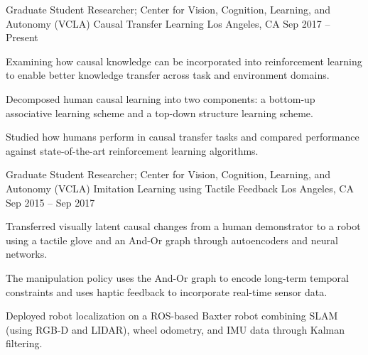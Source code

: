 


\begin{cventries}


\cventry
{Graduate Student Researcher; Center for Vision, Cognition, Learning, and Autonomy (VCLA)}
{Causal Transfer Learning}
{Los Angeles, CA}
{Sep 2017 – Present}
{
\begin{cvitems}
\item Examining how causal knowledge can be incorporated into reinforcement learning to enable better knowledge transfer across task and environment domains.
\item Decomposed human causal learning into two components: a bottom-up associative learning scheme and a top-down structure learning scheme.
\item Studied how humans perform in causal transfer tasks and compared performance against state-of-the-art reinforcement learning algorithms.
\end{cvitems}
}


\cventry
{Graduate Student Researcher; Center for Vision, Cognition, Learning, and Autonomy (VCLA)}
{Imitation Learning using Tactile Feedback}
{Los Angeles, CA}
{Sep 2015 – Sep 2017}
{
\begin{cvitems}
\item Transferred visually latent causal changes from a human demonstrator to a robot using a tactile glove and an And-Or graph through autoencoders and neural networks.
\item The manipulation policy uses the And-Or graph to encode long-term temporal constraints and uses haptic feedback to incorporate real-time sensor data.
\item Deployed robot localization on a ROS-based Baxter robot combining SLAM (using RGB-D and LIDAR), wheel odometry, and IMU data through Kalman filtering.
\end{cvitems}
}


\end{cventries}
